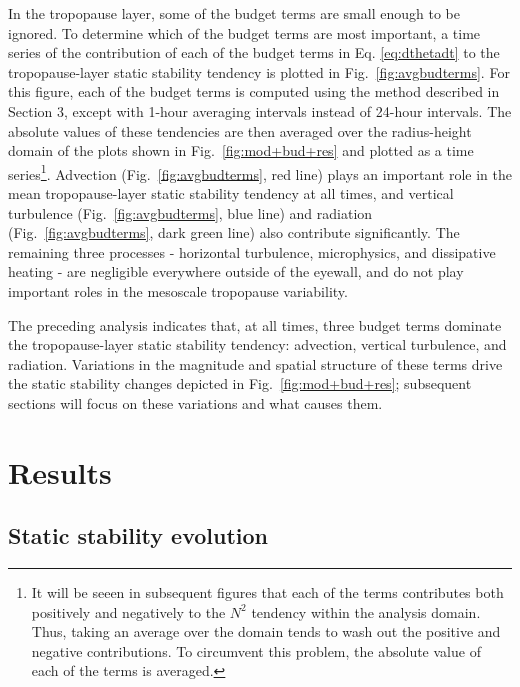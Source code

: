 \documentclass{ametsoc}
\begin{document}
In the tropopause layer, some of the budget terms are small enough to be ignored.
To determine which of the budget terms are most important, a time series of the contribution of each of the budget terms in Eq. \ref{eq:dthetadt} to the tropopause-layer static stability tendency is plotted in Fig.~\ref{fig:avgbudterms}.
For this figure, each of the budget terms is computed using the method described in Section 3, except with 1-hour averaging intervals instead of 24-hour intervals.
The absolute values of these tendencies are then averaged over the radius-height domain of the plots shown in Fig.~\ref{fig:mod+bud+res} and plotted as a time series\footnote{It will be seeen in subsequent figures that each of the terms contributes both positively and negatively to the $N^2$ tendency within the analysis domain. 
Thus, taking an average over the domain tends to wash out the positive and negative contributions.
To circumvent this problem, the absolute value of each of the terms is averaged.}. 
Advection (Fig.~\ref{fig:avgbudterms}, red line) plays an important role in the mean tropopause-layer static stability tendency at all times, and vertical turbulence (Fig.~\ref{fig:avgbudterms}, blue line) and radiation (Fig.~\ref{fig:avgbudterms}, dark green line) also contribute significantly.
The remaining three processes - horizontal turbulence, microphysics, and dissipative heating -  are negligible everywhere outside of the eyewall, and do not play important roles in the mesoscale tropopause variability.

The preceding analysis indicates that, at all times, three budget terms dominate the tropopause-layer static stability tendency: advection, vertical turbulence, and radiation.
Variations in the magnitude and spatial structure of these terms drive the static stability changes depicted in Fig.~\ref{fig:mod+bud+res}; subsequent sections will focus on these variations and what causes them.

 \section{Results}

 \subsection{Static stability evolution}
\end{document}
